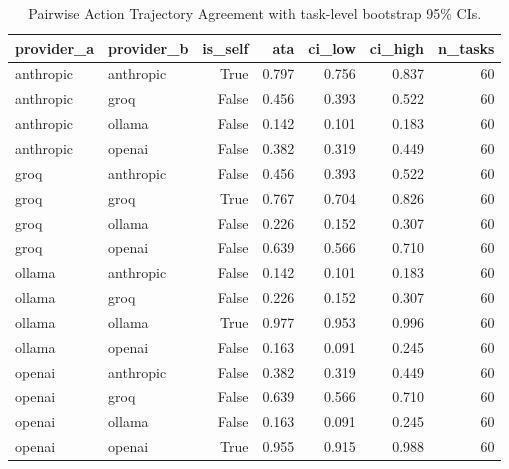 \begin{table}
\caption{Pairwise Action Trajectory Agreement with task-level bootstrap 95\% CIs.}
\label{tab:table3_ata_pairwise}
\begin{tabular}{llrrrrr}
\toprule
provider_a & provider_b & is_self & ata & ci_low & ci_high & n_tasks \\
\midrule
anthropic & anthropic & True & 0.797 & 0.756 & 0.837 & 60 \\
anthropic & groq & False & 0.456 & 0.393 & 0.522 & 60 \\
anthropic & ollama & False & 0.142 & 0.101 & 0.183 & 60 \\
anthropic & openai & False & 0.382 & 0.319 & 0.449 & 60 \\
groq & anthropic & False & 0.456 & 0.393 & 0.522 & 60 \\
groq & groq & True & 0.767 & 0.704 & 0.826 & 60 \\
groq & ollama & False & 0.226 & 0.152 & 0.307 & 60 \\
groq & openai & False & 0.639 & 0.566 & 0.710 & 60 \\
ollama & anthropic & False & 0.142 & 0.101 & 0.183 & 60 \\
ollama & groq & False & 0.226 & 0.152 & 0.307 & 60 \\
ollama & ollama & True & 0.977 & 0.953 & 0.996 & 60 \\
ollama & openai & False & 0.163 & 0.091 & 0.245 & 60 \\
openai & anthropic & False & 0.382 & 0.319 & 0.449 & 60 \\
openai & groq & False & 0.639 & 0.566 & 0.710 & 60 \\
openai & ollama & False & 0.163 & 0.091 & 0.245 & 60 \\
openai & openai & True & 0.955 & 0.915 & 0.988 & 60 \\
\bottomrule
\end{tabular}
\end{table}
